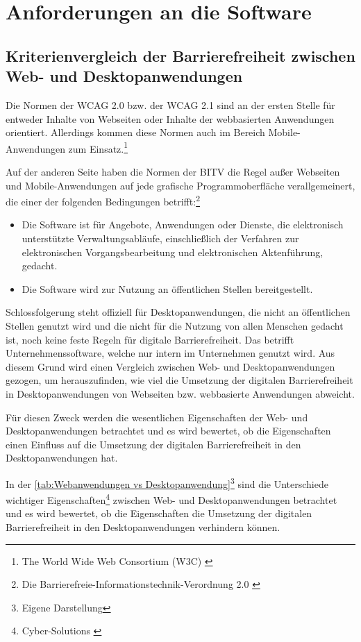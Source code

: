 \section{Anforderungen an die Software}

\subsection{Kriterienvergleich der Barrierefreiheit zwischen Web- und Desktopanwendungen}

Die Normen der \ac{WCAG} 2.0 bzw. der \ac{WCAG} 2.1 sind an der ersten Stelle für entweder Inhalte von Webseiten oder Inhalte der webbasierten Anwendungen orientiert. Allerdings kommen diese Normen auch im Bereich Mobile-Anwendungen zum Einsatz.\footnote{The World Wide Web Consortium (W3C) \cite{w3c}}

Auf der anderen Seite haben die Normen der \ac{BITV} die Regel außer Webseiten und Mobile-Anwendungen auf jede grafische Programmoberfläche verallgemeinert, die einer der folgenden Bedingungen betrifft:\footnote{Die Barrierefreie-Informationstechnik-Verordnung 2.0 \cite{BITV}}

\begin{itemize}
	\item Die Software ist für Angebote, Anwendungen oder Dienste, die elektronisch unterstützte Verwaltungsabläufe, einschließlich der Verfahren zur elektronischen Vorgangsbearbeitung 
	und elektronischen Aktenführung, gedacht.
	\item Die Software wird zur Nutzung an öffentlichen Stellen bereitgestellt.
\end{itemize}

Schlossfolgerung steht offiziell für Desktopanwendungen, die nicht an öffentlichen Stellen genutzt wird und die nicht für die Nutzung von allen Menschen gedacht ist, noch keine feste Regeln für digitale Barrierefreiheit. Das betrifft Unternehmenssoftware, welche nur intern im Unternehmen genutzt wird. Aus diesem Grund wird einen Vergleich zwischen Web- und Desktopanwendungen gezogen, um herauszufinden, wie viel die Umsetzung der digitalen Barrierefreiheit in Desktopanwendungen von Webseiten bzw. webbasierte Anwendungen abweicht.

Für diesen Zweck werden die wesentlichen Eigenschaften der Web- und Desktopanwendungen betrachtet und es wird bewertet, ob die Eigenschaften einen Einfluss auf die Umsetzung der digitalen Barrierefreiheit in den Desktopanwendungen hat.

In der \cref{tab:Webanwendungen vs Desktopanwendung}\footnote{Eigene Darstellung} sind die Unterschiede wichtiger Eigenschaften\footnote{Cyber-Solutions \cite{CyberSolutions}} zwischen Web- und Desktopanwendungen betrachtet und es wird bewertet, ob die Eigenschaften die Umsetzung der digitalen Barrierefreiheit in den Desktopanwendungen verhindern können.


